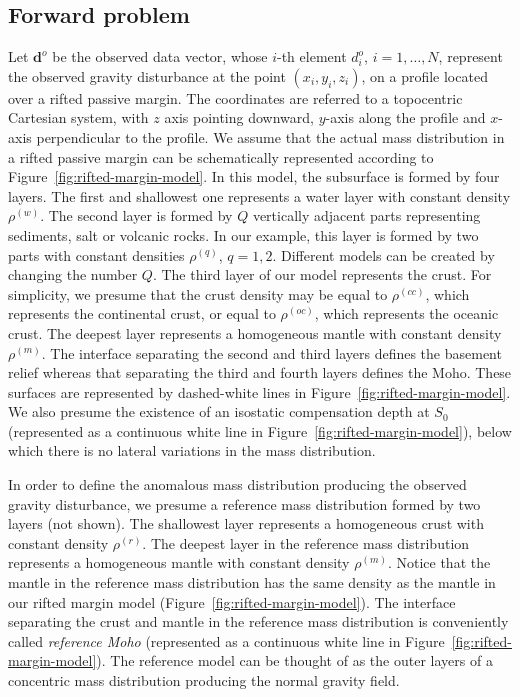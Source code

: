 \documentclass[manuscript]{geophysics}
\begin{document}
\subsection{Forward problem}


Let $\mathbf{d}^{o}$ be the observed data vector, whose $i$-th element $d^{o}_{i}$, 
$i = 1, \dots, N$, represent the observed gravity disturbance at the point 
$(x_{i}, y_{i}, z_{i})$, on a profile located over a rifted passive margin. The
coordinates are referred to a topocentric Cartesian system, with $z$ axis pointing
downward, $y$-axis along the profile and $x$-axis perpendicular to the profile. 
We assume that the actual mass distribution in a rifted passive margin can be 
schematically represented according to Figure~\ref{fig:rifted-margin-model}. 
In this model, the subsurface is formed by four layers. 
The first and shallowest one represents a water layer with constant density
$\rho^{(w)}$. 
The second layer is formed by $Q$ vertically adjacent parts representing sediments,
salt or volcanic rocks.
In our example, this layer is formed by two parts with constant densities
$\rho^{(q)}$, $q = 1, 2$. Different models can be created by changing the number $Q$.
The third layer of our model represents the crust. For simplicity, we presume that the
crust density may be equal to $\rho^{(cc)}$, which
represents the continental crust, or equal to $\rho^{(oc)}$, which represents the
oceanic crust.
The deepest layer represents a homogeneous mantle with constant density $\rho^{(m)}$. 
The interface separating the second and third layers defines the basement relief whereas
that separating the third and fourth layers defines the Moho. These surfaces are
represented by dashed-white lines in Figure~\ref{fig:rifted-margin-model}.
We also presume the existence of an isostatic compensation depth at $S_{0}$ 
(represented as a continuous white line in Figure~\ref{fig:rifted-margin-model}),
below which there is no lateral variations in the mass distribution.

In order to define the anomalous mass distribution producing the observed gravity
disturbance, we presume a reference mass distribution formed by two 
layers (not shown). The shallowest layer represents a homogeneous crust with constant
density $\rho^{(r)}$.
The deepest layer in the reference mass distribution represents a homogeneous mantle
with constant density $\rho^{(m)}$. Notice that the mantle in the reference mass 
distribution has the same density as the mantle in our rifted margin model
(Figure~\ref{fig:rifted-margin-model}).
The interface separating the crust and mantle in the reference mass distribution 
is conveniently called \textit{reference Moho} (represented as a continuous white line
in Figure~\ref{fig:rifted-margin-model}).
The reference model can be thought of as the outer layers of a concentric
mass distribution producing the normal gravity field.
\end{document}
